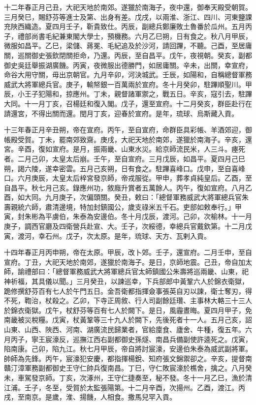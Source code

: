 \begin{pinyinscope}
十二年春正月己丑，大祀天地於南郊。遂獵於南海子，夜中還，御奉天殿受朝賀。三月癸巳，賜舒芬等進士及第、出身有差。戊戌，以兩淮、浙江、四川、河東鹽課充陜西織造。夏四月壬子，靳貴致仕。丙辰，副總兵鄭廉敗土魯番於瓜州。五月丙子，禮部尚書毛紀兼東閣大學士，預機務。六月乙巳朔，日有食之。秋八月甲辰，微服如昌平。乙巳，梁儲、蔣冕、毛紀追及於沙河，請回蹕，不聽。己酉，至居庸關，巡關御史張欽閉關拒命，乃還。丙辰，至自昌平。戊午，夜視朝。癸亥，副都御史吳廷舉振湖廣饑。丙寅，夜微服出德勝門，如居庸關。辛未，出關，幸宣府，命谷大用守關，毋出京朝官。九月辛卯，河決城武。壬辰，如陽和，自稱總督軍務威武大將軍總兵官。庚子，輸帑銀一百萬兩於宣府。冬十月癸卯，駐蹕順聖川。甲辰，小王子犯陽和，掠應州。丁未，親督諸軍禦之，戰五日。辛亥，寇引去，駐蹕大同。十一月丁亥，召楊廷和復入閣。戊子，還至宣府。十二月癸亥，群臣赴行在請還宮，不得出關而還。閏月丁亥，迎春於宣府。是年，琉球、烏斯藏入貢。

十三年春正月辛丑朔，帝在宣府。丙午，至自宣府，命群臣具彩帳、羊酒郊迎，御帳殿受賀。丁未，罷南郊致齋。庚戌，大祀天地於南郊，遂獵於南海子。辛亥，還宮。辛酉，復如宣府。是月，振兩畿、山東水災。給京師流民米，人三斗。瘞死者。二月己卯，太皇太后崩。壬午，至自宣府。三月戊辰，如昌平。夏四月己巳朔，謁六陵，遂幸密雲。五月己亥朔，日有食之。駐蹕喜峰口。戊申，至自喜峰口。六月庚辰，太皇太后梓宮發京師，帝戎服從。甲申，葬孝貞純皇后。乙酉，至自昌平。秋七月己亥。錄應州功，敘廕升賞者五萬餘人。丙午，復如宣府。八月乙酉，如大同。九月庚子，次偏頭關。癸丑，敕曰：「總督軍務威武大將軍總兵官朱壽親統六師，肅清邊境，特加封鎮國公，歲支祿米五千石。吏部如敕奉行。」甲寅，封朱彬為平虜伯，朱泰為安邊伯。冬十月戊辰，渡河。己卯，次榆林。十一月庚子，調西官廳及四衛營兵赴宣、大。壬子，次綏德，幸總兵官戴欽第。十二月戊寅，渡河，幸石州。戊子，次太原。是年，琉球、天方、瓦剌入貢。

十四年春正月丙申朔，帝在太原。甲辰，改卜郊。壬子，還宣府。二月壬申，至自宣府。丁丑，大祀天地於南郊，遂獵於南海子。是日，京師地震。己丑，帝自加太師，諭禮部曰：「總督軍務威武大將軍總兵官太師鎮國公朱壽將巡兩畿、山東，祀神祈福，其具儀以聞。」三月癸丑，以諫巡幸，下兵部郎中黃鞏六人於錦衣衛獄，跪修撰舒芬百有七人於午門五日。金吾衛都指揮僉事張英自刃以諫，衛士奪刃，得不死，鞫治，杖殺之。乙卯，下寺正周敘、行人司副餘廷瓚、主事林大輅三十三人於錦衣衛獄。戊午，杖舒芬等百有七人於闕下。是日，風霾晝晦。夏四月甲子，免南畿被災稅糧。戊寅，杖黃鞏等三十九人於闕下，先後死者十一人。五月己亥，詔山東、山西、陜西、河南、湖廣流民歸業者，官給廩食、廬舍、牛種，復五年。六月丙子，寧王宸濠反，巡撫江西右副都御史孫燧、南昌兵備副使許逵死之。戊寅，陷南康。己卯，陷九江。秋七月甲辰，帝自將討宸濠，安邊伯朱泰為威武副將軍。帥師為先鋒。丙午，宸濠犯安慶，都指揮楊銳、知府張文錦禦卻之。辛亥，提督南贛汀漳軍務副都御史王守仁帥兵復南昌。丁巳，守仁敗宸濠於樵舍，擒之。八月癸未，車駕發京師。丁亥，次涿州，王守仁捷奏至，秘不發。冬十一月乙巳，漁於清江浦。壬子，冬至，受賀於太監張陽第。十二月辛酉，次揚州。乙酉，渡江。丙戌，至南京。是歲，淮、揚饑，人相食。撒馬兒罕入貢。


\end{pinyinscope}
